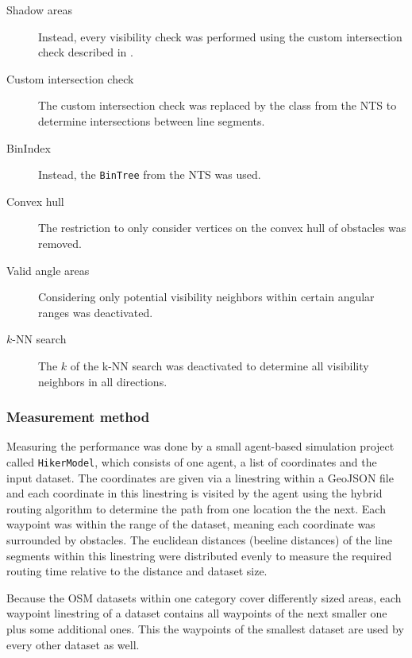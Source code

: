 			\begin{description}
				\item[Shadow areas] Instead, every visibility check was performed using the custom intersection check described in .
				\item[Custom intersection check] The custom intersection check was replaced by the  class from the NTS to determine intersections between line segments.
				\item[BinIndex] Instead, the \texttt{BinTree} from the NTS was used.
				\item[Convex hull] The restriction to only consider vertices on the convex hull of obstacles was removed.
				\item[Valid angle areas] Considering only potential visibility neighbors within certain angular ranges was deactivated.
				\item[$k$-NN search] The $k$ of the k-NN search was deactivated to determine all visibility neighbors in all directions.
			\end{description}		
			
		\subsubsection{Measurement method}
		
			Measuring the performance was done by a small agent-based simulation project called \texttt{HikerModel}, which consists of one agent, a list of coordinates and the input dataset.
			The coordinates are given via a linestring within a GeoJSON file and each coordinate in this linestring is visited by the agent using the hybrid routing algorithm to determine the path from one location the the next.
			Each waypoint was within the range of the dataset, meaning each coordinate was surrounded by obstacles.
			The euclidean distances (beeline distances) of the line segments within this linestring were distributed evenly to measure the required routing time relative to the distance and dataset size.
			
			Because the OSM datasets within one category cover differently sized areas, each waypoint linestring of a dataset contains all waypoints of the next smaller one plus some additional ones.
			This the waypoints of the smallest dataset are used by every other dataset as well.
		
